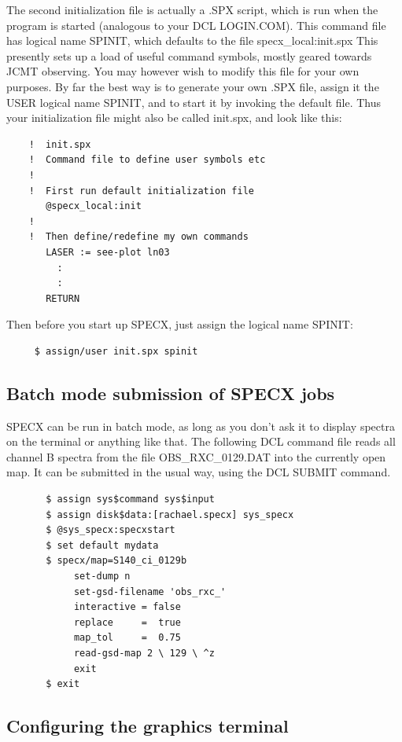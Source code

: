 \documentclass[11pt,twoside]{report}
\begin{document}
The second initialization file is actually a .SPX script, which is run
when the program is started (analogous to your DCL LOGIN.COM). This command
file has logical name SPINIT,
which defaults to the file
specx\_local:init.spx This presently sets up a load of useful command symbols,
mostly geared towards JCMT observing.
You may however wish to modify this file for your own purposes. By far the best way
is to generate your own .SPX file, assign it the USER logical name
SPINIT, and to start it by invoking the default file. Thus your
initialization file might also be called init.spx, and look like this: 
\begin{verbatim}
    !  init.spx
    !  Command file to define user symbols etc
    ! 
    !  First run default initialization file
       @specx_local:init
    !
    !  Then define/redefine my own commands
       LASER := see-plot ln03
         :
         :
       RETURN
\end{verbatim}
Then before you start up SPECX, just assign the logical name SPINIT:
\begin{verbatim}
     $ assign/user init.spx spinit
\end{verbatim}

\subsection{Batch mode submission of SPECX jobs}

SPECX can be run in batch mode, as long as you don't ask it to display
spectra on the terminal or anything like that. The following DCL command
file reads all channel B spectra from the file OBS\_RXC\_0129.DAT into the
currently open map. It can be submitted in the usual way, using the DCL
SUBMIT command.

\begin{verbatim}
       $ assign sys$command sys$input
       $ assign disk$data:[rachael.specx] sys_specx
       $ @sys_specx:specxstart
       $ set default mydata
       $ specx/map=S140_ci_0129b
            set-dump n
            set-gsd-filename 'obs_rxc_'
            interactive = false
            replace     =  true
            map_tol     =  0.75
            read-gsd-map 2 \ 129 \ ^z
            exit
       $ exit
\end{verbatim}

\subsection{Configuring the graphics terminal}
\end{document}
